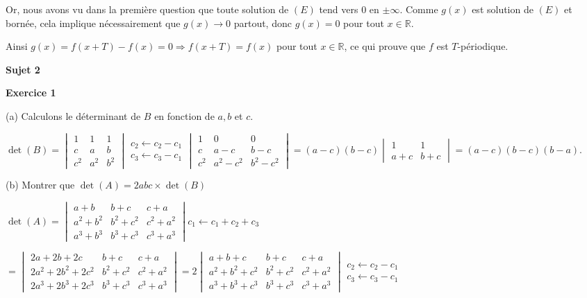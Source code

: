 \documentclass[12pt]{article}
\begin{document}
\begin{spacing}{1.5}
Or, nous avons vu dans la première question que toute solution de $(E)$ tend vers 0 en $\pm\infty$. Comme $g(x)$ est solution de $(E)$ et bornée, cela implique nécessairement que $g(x)\longrightarrow 0$ partout, donc $g(x)=0$ pour tout $x\in \mathbb{R}$.

Ainsi $g(x)=f(x+T)-f(x)=0\Rightarrow f(x+T)=f(x)$ pour tout $x\in \mathbb{R}$, ce qui prouve que $f$ est $T$-périodique.



\quad




\medskip\textbf{Sujet 2}

\textbf{Exercice 1}

(a) Calculons le déterminant de $B$ en fonction de $a,b$ et $c$.


$\det(B)=\begin{vmatrix}
1 & 1 & 1 \\ 
c & a & b \\ 
c^2 & a^2 & b^2
\end{vmatrix}\begin{array}{c}
 c_2\longleftarrow c_2-c_1 \\ 
 c_3\longleftarrow c_3-c_1
 \end{array}  
\begin{vmatrix}
1 & 0 & 0 \\ 
c & a-c & b-c \\ 
c^2 & a^2-c^2 & b^2-c^2
\end{vmatrix} = (a-c)(b-c)\begin{vmatrix}
 1 & 1 \\ 
 a+c & b+c
\end{vmatrix}=(a-c)(b-c)(b-a)$.

(b) Montrer que $\det(A) = 2abc×\det(B)$

$\det(A)=\begin{vmatrix}
a+b & b+c & c+a \\ 
a^2+b^2 & b^2+c^2 & c^2+a^2 \\ 
a^3+b^3 & b^3+c^3 & c^3+a^3
\end{vmatrix}c_1\longleftarrow c_1+c_2+c_3$

$=\begin{vmatrix}
2a+2b+2c & b+c & c+a \\ 
2a^2+2b^2+2c^2 & b^2+c^2 & c^2+a^2 \\ 
2a^3+2b^3+2c^3& b^3+c^3 & c^3+a^3
\end{vmatrix}=2\begin{vmatrix}
a+b+c & b+c & c+a \\ 
a^2+b^2+c^2 & b^2+c^2 & c^2+a^2 \\ 
a^3+b^3+c^3& b^3+c^3 & c^3+a^3
\end{vmatrix}\begin{array}{c}
c_2\longleftarrow c_2-c_1 \\ 
c_3\longleftarrow c_3-c_1
\end{array} $


\end{spacing}
\end{document}
